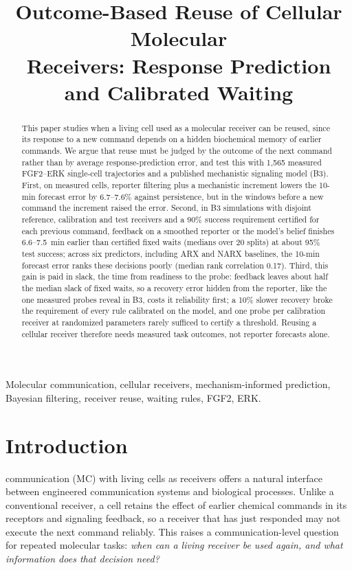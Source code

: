 \documentclass[conference]{IEEEtran}
\title{Outcome-Based Reuse of Cellular Molecular\\ Receivers: Response Prediction\\ and Calibrated Waiting}
\author{\IEEEauthorblockN{Ruifeng Zheng}\IEEEauthorblockA{Deutsche Telekom Chair of Communication Networks\\TU Dresden, Germany}}
\begin{document}
\maketitle

\begin{abstract}
This paper studies when a living cell used as a molecular receiver can be reused, since its response to a new command depends on a hidden biochemical memory of earlier commands. We argue that reuse must be judged by the outcome of the next command rather than by average response-prediction error, and test this with 1,565 measured FGF2--ERK single-cell trajectories and a published mechanistic signaling model (B3). First, on measured cells, reporter filtering plus a mechanistic increment lowers the 10-min forecast error by 6.7--7.6\% against persistence, but in the windows before a new command the increment raised the error. Second, in B3 simulations with disjoint reference, calibration and test receivers and a 90\% success requirement certified for each previous command, feedback on a smoothed reporter or the model's belief finishes 6.6--7.5~min earlier than certified fixed waits (medians over 20 splits) at about 95\% test success; across six predictors, including ARX and NARX baselines, the 10-min forecast error ranks these decisions poorly (median rank correlation 0.17). Third, this gain is paid in slack, the time from readiness to the probe: feedback leaves about half the median slack of fixed waits, so a recovery error hidden from the reporter, like the one measured probes reveal in B3, costs it reliability first; a 10\% slower recovery broke the requirement of every rule calibrated on the model, and one probe per calibration receiver at randomized parameters rarely sufficed to certify a threshold. Reusing a cellular receiver therefore needs measured task outcomes, not reporter forecasts alone.
\end{abstract}

\begin{IEEEkeywords}
Molecular communication, cellular receivers, mechanism-informed prediction, Bayesian filtering, receiver reuse, waiting rules, FGF2, ERK.
\end{IEEEkeywords}

\section{Introduction}
 communication (MC) with living cells as receivers offers a natural interface between engineered communication systems and biological processes. Unlike a conventional receiver, a cell retains the effect of earlier chemical commands in its receptors and signaling feedback, so a receiver that has just responded may not execute the next command reliably. This raises a communication-level question for repeated molecular tasks: \emph{when can a living receiver be used again, and what information does that decision need?}
\end{document}
